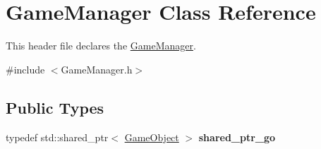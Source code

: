 \hypertarget{class_game_manager}{}\section{Game\+Manager Class Reference}
\label{class_game_manager}


This header file declares the \hyperlink{class_game_manager}{Game\+Manager}.  




{\ttfamily \#include $<$Game\+Manager.\+h$>$}

\subsection*{Public Types}
\begin{DoxyCompactItemize}
\item 
\hypertarget{class_game_manager_a914354142c4a40b1585c3f56a5059fcb}{}typedef std\+::shared\+\_\+ptr$<$ \hyperlink{class_game_object}{Game\+Object} $>$ {\bfseries shared\+\_\+ptr\+\_\+go}\label{class_game_manager_a914354142c4a40b1585c3f56a5059fcb}

\end{DoxyCompactItemize}
